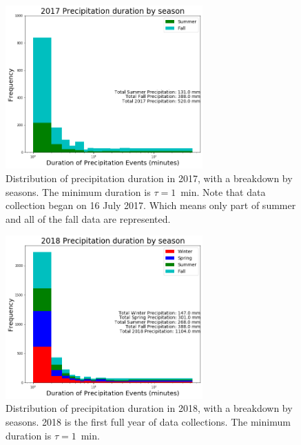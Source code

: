 \documentclass[11pt]{report}
\begin{document}
\clearpage
\begin{figure}[t]
  \centering
  \includegraphics[width=0.675\textwidth]{Figures/precip_2017.png}
  \caption[Precipitation histogram for 2017 broken down by
    season]{\label{p2017} Distribution of precipitation duration in 2017,
    with a breakdown by seasons. The minimum duration is $\tau = 1$~min.
    Note that data collection began on 16 July 2017. Which means only
    part of summer and all of the fall data are represented.  }
\end{figure}
\begin{figure}[b]
  \centering
  \includegraphics[width=0.675\textwidth]{Figures/precip_2018.png}
  \caption[Precipitation histogram for 2018 broken down by
    season]{\label{p2018} Distribution of precipitation duration in 2018,
    with a breakdown by seasons. 2018 is the first full year of data
    collections. The minimum duration is $\tau = 1$~min.}
\end{figure}
\end{document}
